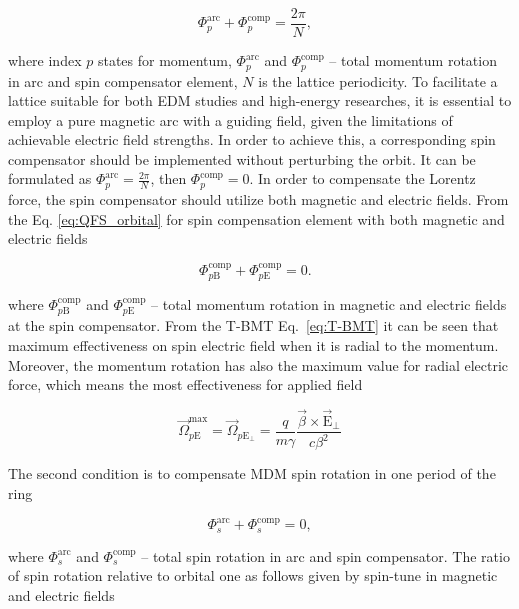 \documentclass[a4paper,
               keeplastbox,   %
               ]{jacow}
\begin{document}
\begin{equation}
	\Phi_p^{\textrm{arc}}+\Phi_{p}^{\textrm{comp}}=\frac{2\pi}{N},\ \ \
	\label{eq:QFS_orbital}
\end{equation}

\noindent where index $p$ states for momentum, $\Phi_p^{\textrm{arc}}$ and $\Phi_{p}^{\textrm{comp}}$ -- total momentum rotation in arc and spin compensator element, $N$ is the lattice periodicity. To facilitate a lattice suitable for both EDM studies and high-energy researches, it is essential to employ a pure magnetic arc with a guiding field, given the limitations of achievable electric field strengths. In order to achieve this, a corresponding spin compensator should be implemented without perturbing the orbit. It can be formulated as $\Phi_p^{\textrm{arc}} = \frac{2\pi}{N}$, then $\Phi_{p}^{\textrm{comp}} = 0$. In order to compensate the Lorentz force, the spin compensator should utilize both magnetic and electric fields. From the Eq. \ref{eq:QFS_orbital} for spin compensation element with both magnetic and electric fields

\begin{equation}
	\Phi_{p\textrm{B}}^{\textrm{comp}}+{\Phi}_{p\textrm{E}}^{\textrm{comp}} = 0.\ \ \ 
\end{equation}

\noindent where $\Phi_{p\textrm{B}}^{\textrm{comp}}$ and ${\Phi}_{p\textrm{E}}^{\textrm{comp}}$ -- total momentum rotation in magnetic and electric fields at the spin compensator. From the T-BMT Eq.~\ref{eq:T-BMT} it can be seen that maximum effectiveness on spin electric field when it is radial to the momentum. Moreover, the momentum rotation has also the maximum value for radial electric force, which means the most effectiveness for applied field

\begin{equation}
	\vec{\Omega}_{p\mathrm{E}}^{\text{max}} = \vec{\Omega}_{p\mathrm{E}_{\perp}}=\frac{q}{m \gamma} \frac{\vec{\beta} \times \vec{\mathrm{E}}_{\perp}}{c \beta^2}
\end{equation}

\par The second condition is to compensate MDM spin rotation in one period of the ring 

\begin{equation}
	\Phi_s^{\textrm{arc}}+\Phi_{s}^{\textrm{comp}}=0,
	\label{eq:QFS_spin}
\end{equation}

\noindent where $\Phi_s^{\textrm{arc}}$ and $\Phi_{s}^{\textrm{comp}}$ -- total spin rotation in arc and spin compensator. The ratio of spin rotation relative to orbital one as follows given by spin-tune in magnetic and electric fields
\end{document}
